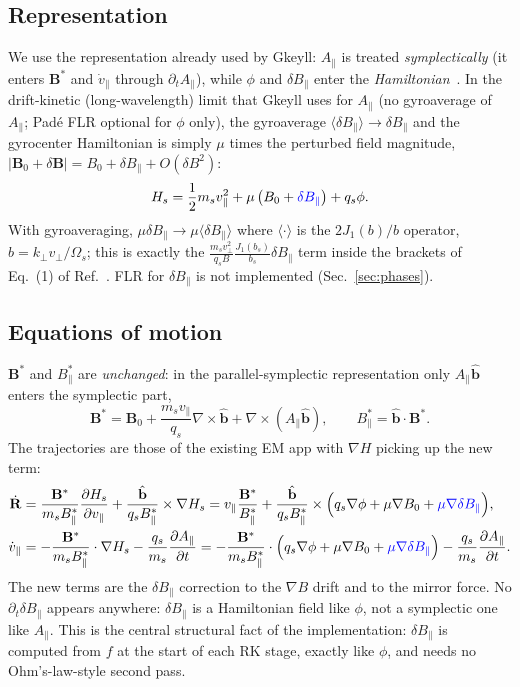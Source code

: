 \documentclass[11pt, letterpaper]{article}
\newcommand{\dBpar}{\delta B_\parallel}
\newcommand{\Bstar}{\mathbf{B}^*}
\newcommand{\Bparstar}{B^*_\parallel}
\newcommand{\bhat}{\hat{\mathbf{b}}}
\newcommand{\vpar}{v_\parallel}
\newcommand{\Apar}{A_\parallel}
\newcommand{\new}[1]{\textcolor{blue}{#1}}
\begin{document}
\subsection{Representation}
We use the representation already used by Gkeyll: $\Apar$ is treated
\emph{symplectically} (it enters $\Bstar$ and $\dot\vpar$ through $\partial_t\Apar$), while
$\phi$ and $\dBpar$ enter the \emph{Hamiltonian}~\cite{BrizardHahm2007}. In the drift-kinetic
(long-wavelength) limit that Gkeyll uses for $\Apar$ (no gyroaverage of $\Apar$; Pad\'e FLR
optional for $\phi$ only), the gyroaverage $\langle\dBpar\rangle \to \dBpar$ and the gyrocenter
Hamiltonian is simply $\mu$ times the perturbed field magnitude,
$|\mathbf{B}_0+\delta\mathbf{B}| = B_0 + \dBpar + O(\delta B^2)$:
\begin{equation}
  H_s = \frac{1}{2} m_s \vpar^2 + \mu\left(B_0 + \new{\dBpar}\right) + q_s \phi .
  \label{eq:hamil}
\end{equation}
With gyroaveraging, $\mu\dBpar \to \mu\langle\dBpar\rangle$ where
$\langle\cdot\rangle$ is the $2J_1(b)/b$ operator, $b=k_\perp v_\perp/\Omega_s$;
this is exactly the $\frac{m_s v_\perp^2}{q_s B}\frac{J_1(b_s)}{b_s}\dBpar$ term inside the
brackets of Eq.~(1) of Ref.~\cite{Kennedy2024}. FLR for $\dBpar$ is not implemented (Sec.~\ref{sec:phases}).

\subsection{Equations of motion}
$\Bstar$ and $\Bparstar$ are \emph{unchanged}: in the parallel-symplectic representation only
$\Apar\bhat$ enters the symplectic part,
\begin{equation}
  \Bstar = \mathbf{B}_0 + \frac{m_s\vpar}{q_s}\nabla\times\bhat + \nabla\times(\Apar\bhat),
  \qquad \Bparstar = \bhat\cdot\Bstar .
\end{equation}
The trajectories are those of the existing EM app with $\nabla H$ picking up the new term:
\begin{align}
  \dot{\mathbf{R}} &= \frac{\Bstar}{m_s\Bparstar}\frac{\partial H_s}{\partial\vpar}
     + \frac{\bhat}{q_s\Bparstar}\times\nabla H_s
   = \vpar\frac{\Bstar}{\Bparstar}
     + \frac{\bhat}{q_s\Bparstar}\times\Big(q_s\nabla\phi + \mu\nabla B_0 + \new{\mu\nabla\dBpar}\Big),
  \label{eq:Rdot}\\
  \dot\vpar &= -\frac{\Bstar}{m_s\Bparstar}\cdot\nabla H_s - \frac{q_s}{m_s}\frac{\partial\Apar}{\partial t}
   = -\frac{\Bstar}{m_s\Bparstar}\cdot\Big(q_s\nabla\phi + \mu\nabla B_0 + \new{\mu\nabla\dBpar}\Big)
     - \frac{q_s}{m_s}\frac{\partial\Apar}{\partial t}.
  \label{eq:vpardot}
\end{align}
The new terms are the $\dBpar$ correction to the $\nabla B$ drift and to the mirror force.
No $\partial_t\dBpar$ appears anywhere: $\dBpar$ is a Hamiltonian field like $\phi$, not a
symplectic one like $\Apar$. This is the central structural fact of the
implementation: $\dBpar$ is computed from $f$ at the start of each RK stage, exactly like $\phi$,
and needs no Ohm's-law-style second pass.
\end{document}
